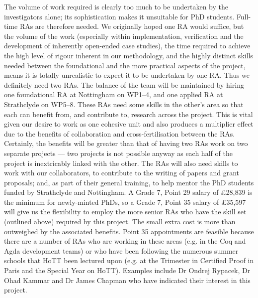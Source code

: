 \documentclass[a4paper,11pt]{article}
\begin{document}
\vspace{0.02in}

The volume of work required is clearly too much to be undertaken by
the investigators alone; its sophistication makes it unsuitable
for PhD students. Full-time RAs are therefore needed. We 
originally hoped one RA would suffice, but the volume of the
work (especially within implementation, verification and the
development of inherently open-ended case studies), the time required
to achieve the high level of rigour inherent in our methodology, and the highly
distinct skills needed between the foundational and the
more practical aspects of the project, means it is totally unrealistic
to expect it to be undertaken by one RA. Thus we definitely need two
RAs. The balance of the team will be maintained by hiring one
foundational RA at
Nottingham on WP1--4, and one applied RA at Strathclyde on WP5--8. These RAs
need some skills in the other's area so that each can benefit from, and
contribute to, research across the project. This is vital given our
desire to work as one cohesive unit and also produces a multiplier
effect due to the benefits of collaboration and cross-fertilisation
between the RAs. Certainly, the benefits will be greater than that of
having two RAs work on two separate projects --- two 
projects is not possible anyway as each half of the project is
inextricably linked with the other. The RAs will also need skills to
work with our collaborators, to contribute to the writing of papers
and grant proposals; and, as part of their general training, to help
mentor the PhD students funded by Strathclyde and Nottingham.  A Grade
7, Point 29 salary of $\pounds$28,839 is the minimum for newly-minted
PhDs, so a Grade 7, Point 35 salary of $\pounds$35,597 will give us
the flexibility to employ the more senior RAs who have the 
skill set (outlined above) required by this project. The small extra
cost is more than outweighed by the associated benefits. Point 35
appointments are feasible because there are a number of RAs who are
working in these areas (e.g. in the Coq and Agda development teams) or
who have been following the numerous summer schools that HoTT been
lectured upon (e.g. at the Trimester in Certified Proof in Paris and the
Special Year on HoTT). Examples include Dr Ondrej Rypacek, Dr Ohad Kammar and Dr James
Chapman who have indicated their interest in this project.
\vspace{0.02in}
\end{document}
